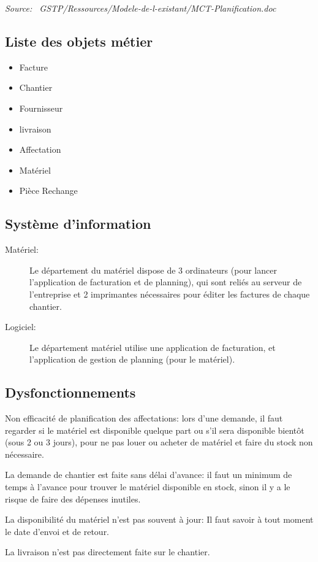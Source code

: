     {\sl Source:~{\ttfamily 
        GSTP/Ressources/Modele-de-l-existant/MCT-Planification.doc}}


\subsection{Liste des objets métier}

    \begin{itemize}
    	\item Facture
    	\item Chantier
    	\item Fournisseur
    	\item livraison
    	\item Affectation
    	\item Matériel
    	\item Pièce Rechange
    \end{itemize}

\subsection{Système d'information}

    \begin{description}
        \item [Matériel:]\el 
            Le département du matériel dispose de 3 ordinateurs (pour lancer
            l'application de facturation et de planning), qui sont reliés au
            serveur de l'entreprise et 2 imprimantes nécessaires pour
            éditer les factures de chaque chantier.

        \item [Logiciel:]\el
            Le département matériel utilise une application de facturation,
            et l'application de gestion de planning (pour le matériel).
    \end{description}

\subsection{Dysfonctionnements}

    Non efficacité de planification des affectations: lors d'une demande,
    il faut regarder si le matériel est disponible quelque part ou s'il sera
    disponible bientôt (sous 2 ou 3 jours), pour ne pas louer ou acheter de
    matériel et faire du stock non nécessaire.

    La demande de chantier est faite sans délai d'avance: il faut un minimum
    de temps à l'avance pour trouver le matériel disponible en stock, sinon
    il y a le risque de faire des dépenses inutiles.

    La disponibilité du matériel n'est pas souvent à jour: Il faut savoir à
    tout moment le date d'envoi et de retour.

    La livraison n'est pas directement faite sur le chantier.
